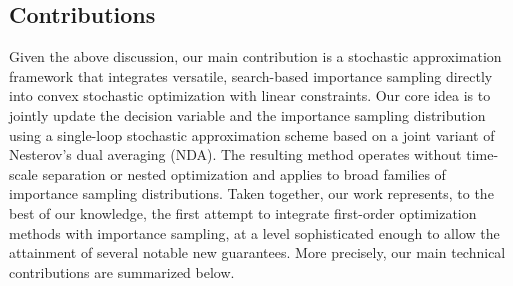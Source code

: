 \documentclass[11pt,a4paper]{article}
\theoremstyle{definition}
\begin{document}
\subsection{Contributions}
\label{subsec:contributions}

Given the above discussion, our main contribution is a stochastic approximation framework that integrates versatile, search-based importance sampling directly into convex stochastic optimization with linear constraints. Our core idea is to jointly update the decision variable and the importance sampling distribution using a single-loop stochastic approximation scheme based on a joint variant of Nesterov’s dual averaging (NDA). The resulting method operates without time-scale separation or nested optimization and applies to broad families of importance sampling distributions. Taken together, our work represents, to the best of our knowledge, the first attempt to integrate first-order optimization methods with importance sampling, at a level sophisticated enough to allow the attainment of several notable new guarantees. More precisely, our main technical contributions are summarized below.
\end{document}

